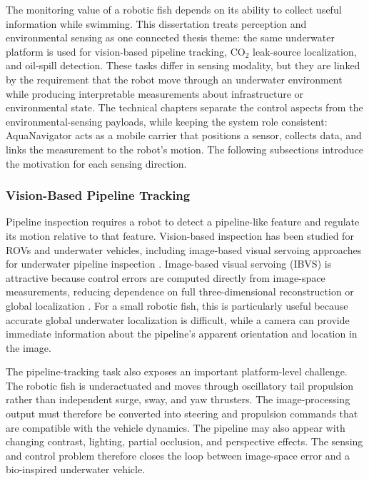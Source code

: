 \documentclass{uhcoethesis}
\begin{document}
The monitoring value of a robotic fish depends on its ability to collect useful information while swimming. This dissertation treats perception and environmental sensing as one connected thesis theme: the same underwater platform is used for vision-based pipeline tracking, \mbox{CO$_2$} leak-source localization, and oil-spill detection. These tasks differ in sensing modality, but they are linked by the requirement that the robot move through an underwater environment while producing interpretable measurements about infrastructure or environmental state. The technical chapters separate the control aspects from the environmental-sensing payloads, while keeping the system role consistent: AquaNavigator acts as a mobile carrier that positions a sensor, collects data, and links the measurement to the robot's motion. The following subsections introduce the motivation for each sensing direction.

\subsubsection{Vision-Based Pipeline Tracking}

Pipeline inspection requires a robot to detect a pipeline-like feature and regulate its motion relative to that feature. Vision-based inspection has been studied for ROVs and underwater vehicles, including image-based visual servoing approaches for underwater pipeline inspection \cite{Yi2023}. Image-based visual servoing (IBVS) is attractive because control errors are computed directly from image-space measurements, reducing dependence on full three-dimensional reconstruction or global localization \cite{Reynolds1999}. For a small robotic fish, this is particularly useful because accurate global underwater localization is difficult, while a camera can provide immediate information about the pipeline's apparent orientation and location in the image.

The pipeline-tracking task also exposes an important platform-level challenge. The robotic fish is underactuated and moves through oscillatory tail propulsion rather than independent surge, sway, and yaw thrusters. The image-processing output must therefore be converted into steering and propulsion commands that are compatible with the vehicle dynamics. The pipeline may also appear with changing contrast, lighting, partial occlusion, and perspective effects. The sensing and control problem therefore closes the loop between image-space error and a bio-inspired underwater vehicle.
\end{document}
